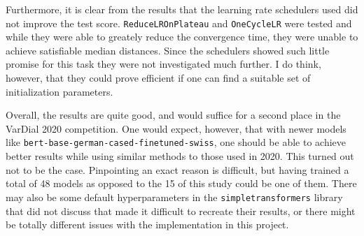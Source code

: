 Furthermore, it is clear from the results that the learning rate schedulers used did not improve the test score. \texttt{ReduceLROnPlateau} and \texttt{OneCycleLR} were tested and while they were able to greately reduce the convergence time, they were unable to achieve satisfiable median distances. Since the schedulers showed such little promise for this task they were not investigated much further. I do think, however, that they could prove efficient if one can find a suitable set of initialization parameters.

Overall, the results are quite good, and would suffice for a second place in the VarDial 2020 competition. One would expect, however, that with newer models like \texttt{bert-base-german-cased-finetuned-swiss}, one should be able to achieve better results while using similar methods to those used in 2020. This turned out not to be the case. Pinpointing an exact reason is difficult, but \cite{scherrerHeLjuVarDial20202020} having trained a total of 48 models as opposed to the 15 of this study could be one of them. There may also be some default hyperparameters in the \texttt{simpletransformers} library that \cite{scherrerHeLjuVarDial20202020} did not discuss that made it difficult to recreate their results, or there might be totally different issues with the implementation in this project.
